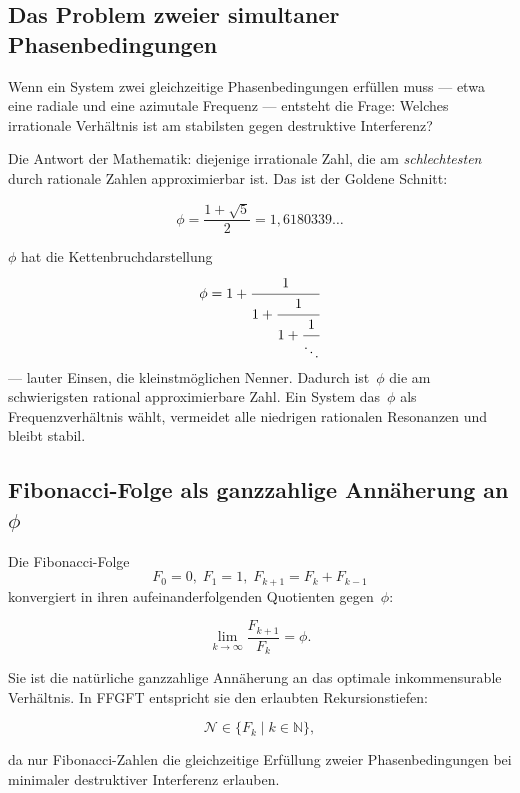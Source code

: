 \subsection{Das Problem zweier simultaner Phasenbedingungen}

Wenn ein System zwei gleichzeitige Phasenbedingungen erfüllen muss —
etwa eine radiale und eine azimutale Frequenz — entsteht die Frage:
Welches irrationale Verhältnis ist am stabilsten gegen destruktive
Interferenz?

Die Antwort der Mathematik: diejenige irrationale Zahl, die am
\emph{schlechtesten} durch rationale Zahlen approximierbar ist.
Das ist der Goldene Schnitt:

\begin{equation}
  \phi = \frac{1 + \sqrt{5}}{2} = 1{,}6180339\ldots
\end{equation}

\begin{keybox}
$\phi$ hat die Kettenbruchdarstellung
\[
  \phi = 1 + \cfrac{1}{1 + \cfrac{1}{1 + \cfrac{1}{\ddots}}}
\]
— lauter Einsen, die kleinstmöglichen Nenner. Dadurch ist~$\phi$ die
am schwierigsten rational approximierbare Zahl. Ein System das~$\phi$
als Frequenzverhältnis wählt, vermeidet alle niedrigen rationalen
Resonanzen und bleibt stabil.
\end{keybox}

\subsection{Fibonacci-Folge als ganzzahlige Annäherung an $\phi$}

Die Fibonacci-Folge
\begin{equation}
  F_0 = 0,\; F_1 = 1,\; F_{k+1} = F_k + F_{k-1}
\end{equation}
konvergiert in ihren aufeinanderfolgenden Quotienten gegen~$\phi$:

\begin{equation}
  \lim_{k \to \infty} \frac{F_{k+1}}{F_k} = \phi.
\end{equation}

Sie ist die natürliche ganzzahlige Annäherung an das optimale
inkommensurable Verhältnis. In FFGFT entspricht sie den erlaubten
Rekursionstiefen:

\begin{equation}
  \mathcal{N} \in \{F_k \mid k \in \mathbb{N}\},
\end{equation}

da nur Fibonacci-Zahlen die gleichzeitige Erfüllung zweier
Phasenbedingungen bei minimaler destruktiver Interferenz erlauben.

